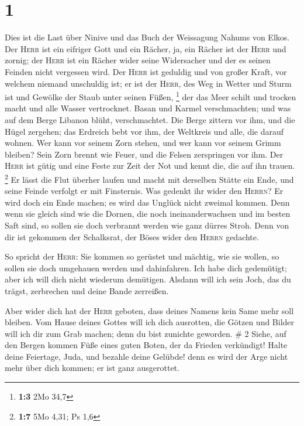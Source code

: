 \hypertarget{section}{%
\section{1}\label{section}}

 Dies ist die Last über Ninive und das Buch der Weissagung
Nahums von Elkos.  Der \textsc{Herr} ist ein eifriger Gott
und ein Rächer, ja, ein Rächer ist der \textsc{Herr} und zornig; der
\textsc{Herr} ist ein Rächer wider seine Widersacher und der es seinen
Feinden nicht vergessen wird.  Der \textsc{Herr} ist
geduldig und von großer Kraft, vor welchem niemand unschuldig ist; er
ist der \textsc{Herr}, des Weg in Wetter und Sturm ist und Gewölke der
Staub unter seinen Füßen, \footnote{\textbf{1:3} 2Mo 34,7}
 der das Meer schilt und trocken macht und alle Wasser
vertrocknet. Basan und Karmel verschmachten; und was auf dem Berge
Libanon blüht, verschmachtet.  Die Berge zittern vor ihm,
und die Hügel zergehen; das Erdreich bebt vor ihm, der Weltkreis und
alle, die darauf wohnen.  Wer kann vor seinem Zorn stehen,
und wer kann vor seinem Grimm bleiben? Sein Zorn brennt wie Feuer, und
die Felsen zerspringen vor ihm.  Der \textsc{Herr} ist
gütig und eine Feste zur Zeit der Not und kennt die, die auf ihn trauen.
\footnote{\textbf{1:7} 5Mo 4,31; Ps 1,6}  Er lässt die
Flut überher laufen und macht mit derselben Stätte ein Ende, und seine
Feinde verfolgt er mit Finsternis.  Was gedenkt ihr wider
den \textsc{Herrn}? Er wird doch ein Ende machen; es wird das Unglück
nicht zweimal kommen.  Denn wenn sie gleich sind wie die
Dornen, die noch ineinanderwachsen und im besten Saft sind, so sollen
sie doch verbrannt werden wie ganz dürres Stroh.  Denn
von dir ist gekommen der Schalksrat, der Böses wider den \textsc{Herrn}
gedachte.

 So spricht der \textsc{Herr}: Sie kommen so gerüstet und
mächtig, wie sie wollen, so sollen sie doch umgehauen werden und
dahinfahren. Ich habe dich gedemütigt; aber ich will dich nicht wiederum
demütigen.  Alsdann will ich sein Joch, das du trägst,
zerbrechen und deine Bande zerreißen.

 Aber wider dich hat der \textsc{Herr} geboten, dass
deines Namens kein Same mehr soll bleiben. Vom Hause deines Gottes will
ich dich ausrotten, die Götzen und Bilder will ich dir zum Grab machen;
denn du bist zunichte geworden. \# 2  Siehe, auf den
Bergen kommen Füße eines guten Boten, der da Frieden verkündigt! Halte
deine Feiertage, Juda, und bezahle deine Gelübde! denn es wird der Arge
nicht mehr über dich kommen; er ist ganz ausgerottet.

